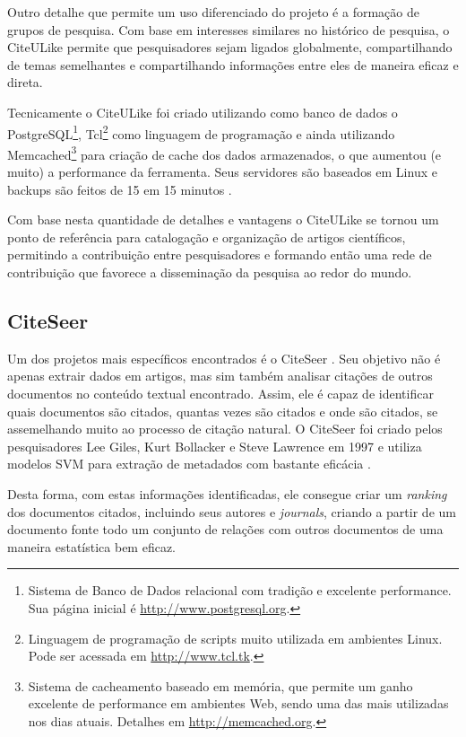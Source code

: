 \begin{textnew}
Outro detalhe que permite um uso diferenciado do projeto é a formação de grupos de pesquisa. Com base em interesses similares no histórico de pesquisa, o CiteULike permite que pesquisadores sejam ligados globalmente, compartilhando de temas semelhantes e compartilhando informações entre eles de maneira eficaz e direta.

Tecnicamente o CiteULike foi criado utilizando como banco de dados o PostgreSQL\footnote{Sistema de Banco de Dados relacional com tradição e excelente performance. Sua página inicial é \url{http://www.postgresql.org}.}, Tcl\footnote{Linguagem de programação de scripts muito utilizada em ambientes Linux. Pode ser acessada em \url{http://www.tcl.tk}.} como linguagem de programação e ainda utilizando Memcached\footnote{Sistema de cacheamento baseado em memória, que permite um ganho excelente de performance em ambientes Web, sendo uma das mais utilizadas nos dias atuais. Detalhes em \url{http://memcached.org}.} para criação de cache dos dados armazenados, o que aumentou (e muito) a performance da ferramenta. Seus servidores são baseados em Linux e backups são feitos de 15 em 15 minutos \cite{citeulike}.

Com base nesta quantidade de detalhes e vantagens o CiteULike se tornou um ponto de referência para catalogação e organização de artigos científicos, permitindo a contribuição entre pesquisadores e formando então uma rede de contribuição que favorece a disseminação da pesquisa ao redor do mundo.

\end{textnew}


\subsection{CiteSeer}
\label{ssec:citeseer}

Um dos projetos mais específicos encontrados é o CiteSeer \cite{citeseer}. Seu objetivo não é apenas extrair dados em artigos, mas sim também analisar citações de outros documentos no conteúdo textual encontrado. Assim, ele é capaz de identificar quais documentos são citados, quantas vezes são citados e onde são citados, se assemelhando muito ao processo de citação natural. O CiteSeer foi criado pelos pesquisadores Lee Giles, Kurt Bollacker e Steve Lawrence em 1997 e utiliza modelos SVM para extração de metadados com bastante eficácia \cite{Granitzer-2012-LayoutBased}.

Desta forma, com estas informações identificadas, ele consegue criar um \textit{ranking} dos documentos citados, incluindo seus autores e \textit{journals}, criando a partir de um documento fonte todo um conjunto de relações com outros documentos de uma maneira estatística bem eficaz.

